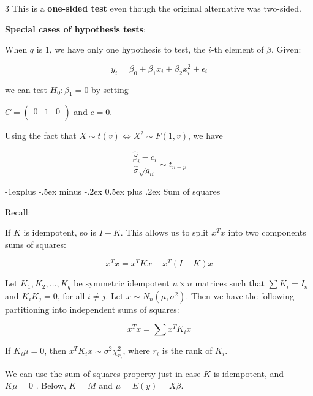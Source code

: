 \documentclass[10pt,landscape]{article}
\makeatletter
\newenvironment{fmpage}[1]
{\begin{lrbox}{\fmbox}\begin{minipage}{#1}}
{\end{minipage}\end{lrbox}\fbox{\usebox{\fmbox}}}
\renewcommand{\subsection}{\@startsection{subsection}{2}{0mm}%
                                {-1explus -.5ex minus -.2ex}%
                                {0.5ex plus .2ex}%
                                {\normalfont\normalsize\bfseries}}
\makeatother
\begin{document}
\begin{multicols}{3}
This is a \textbf{one-sided test} even though the original alternative was two-sided.

\textbf{Special cases of hypothesis tests}:

When $q$ is 1, we have only one hypothesis to test, the $i$-th element of $\beta$. Given:

\begin{equation}
y_i = \beta_0 + \beta_1 x_i + \beta_2 x_i^2+\epsilon_i
\end{equation}

\noindent
we can test $H_0: \beta_1=0$ by setting 

$C=\begin{pmatrix} 
0 & 1 & 0\\
\end{pmatrix}$
and $c=0$.


Using the fact that $X\sim t(v)\Leftrightarrow X^2 \sim F(1,v)$, we have


\begin{equation}
\frac{\hat{\beta}_i - c_i}{\hat{\sigma}\sqrt{g_{ii}}} \sim t_{n-p}
\end{equation}
 
 \subsection{Sum of squares}

\begin{fmpage}{\linewidth}

Recall:

If $K$ is idempotent, so is $I-K$. This allows us to split $x^T x$ into two components sums of squares:

\begin{equation}
x^T x = x^T K x+x^T (I-K) x
\end{equation}

 Let $K_1, K_2,\dots, K_q$ be symmetric idempotent $n \times n$ matrices such that
 $\sum K_i= I_n$ and $K_iK_j =0$, for all $i\neq j $. Let $x\sim N_n(\mu, \sigma^2)$.
 Then we have the following partitioning into independent sums of squares:
 
  \begin{equation}
x^T x = \sum x^T K_i x
\end{equation}

If $K_i \mu = 0$, then $ x^T K_i x\sim \sigma^2 \chi_{r_i}^2$, where $r_i$ is the rank of $K_i$.
\end{fmpage}

We can use the sum of squares property just in case $K$ is idempotent, and $K\mu =0$ . Below, $K=M$ and $\mu=E(y)=X\beta$.


\end{multicols}
\end{document}
